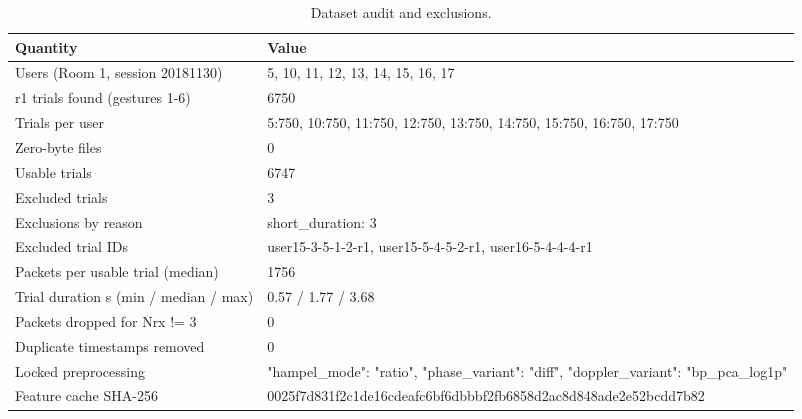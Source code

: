 \begin{table}[t]
\centering
\small
\caption{Dataset audit and exclusions.}
\label{tab:T1b_data_audit}
\begin{tabular}{ll}
\hline
Quantity & Value \\
\hline
Users (Room 1, session 20181130) & 5, 10, 11, 12, 13, 14, 15, 16, 17 \\
r1 trials found (gestures 1-6) & 6750 \\
Trials per user & 5:750, 10:750, 11:750, 12:750, 13:750, 14:750, 15:750, 16:750, 17:750 \\
Zero-byte files & 0 \\
Usable trials & 6747 \\
Excluded trials & 3 \\
Exclusions by reason & short\_duration: 3 \\
Excluded trial IDs & user15-3-5-1-2-r1, user15-5-4-5-2-r1, user16-5-4-4-4-r1 \\
Packets per usable trial (median) & 1756 \\
Trial duration s (min / median / max) & 0.57 / 1.77 / 3.68 \\
Packets dropped for Nrx != 3 & 0 \\
Duplicate timestamps removed & 0 \\
Locked preprocessing & {"hampel\_mode": "ratio", "phase\_variant": "diff", "doppler\_variant": "bp\_pca\_log1p"} \\
Feature cache SHA-256 & 0025f7d831f2c1de16cdeafc6bf6dbbbf2fb6858d2ac8d848ade2e52bcdd7b82 \\
\hline
\end{tabular}
\end{table}

